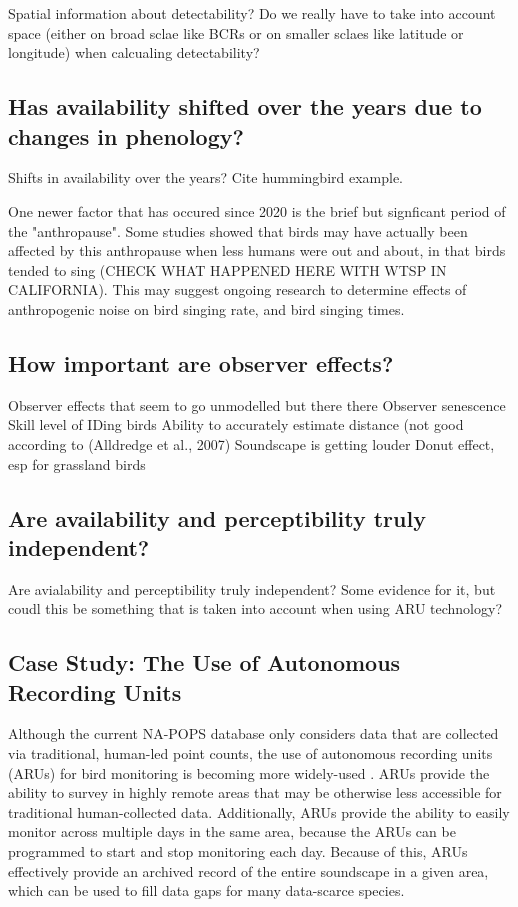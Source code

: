 Spatial information about detectability? Do we really have to take into account space (either on broad sclae like BCRs or on smaller sclaes like latitude or longitude) when calcualing detectability?

\subsection{Has availability shifted over the years due to changes in phenology?}

Shifts in availability over the years? Cite hummingbird example.

\par One newer factor that has occured since 2020 is the brief but signficant period of the "anthropause".
Some studies showed that birds may have actually been affected by this anthropause when less humans were out and about, in that birds tended to sing (CHECK WHAT HAPPENED HERE WITH WTSP IN CALIFORNIA).
This may suggest ongoing research to determine effects of anthropogenic noise on bird singing rate, and bird singing times.

\subsection{How important are observer effects?}
Observer effects that seem to go unmodelled but there there 
Observer senescence 
Skill level of IDing birds 
Ability to accurately estimate distance (not good according to (Alldredge et al., 2007) 
Soundscape is getting louder 
Donut effect, esp for grassland birds 

\subsection{Are availability and perceptibility truly independent?}

Are avialability and perceptibility truly independent? Some evidence for it, but coudl this be something that is taken into account when using ARU technology?

\subsection{Case Study: The Use of Autonomous Recording Units}

\par Although the current NA-POPS database only considers data that are collected via traditional, human-led point counts, the use of autonomous recording units (ARUs) for bird monitoring is becoming more widely-used \citep{perezgranados_estimating_2021, shonfield_autonomous_2017, sugai_terrestrial_2019}.
ARUs provide the ability to survey in highly remote areas that may be otherwise less accessible for traditional human-collected data.
Additionally, ARUs provide the ability to easily monitor across multiple days in the same area, because the ARUs can be programmed to start and stop monitoring each day.
Because of this, ARUs effectively provide an archived record of the entire soundscape in a given area, which can be used to fill data gaps for many data-scarce species.

